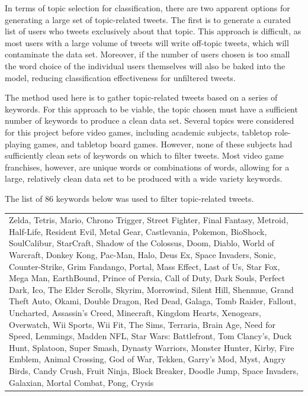 \documentclass[11pt]{revtex4-1}
\begin{document}
In terms of topic selection for classification, there are two apparent
options for generating a large set of topic-related tweets.  The first
is to generate a curated list of users who tweets exclusively about
that topic.  This approach is difficult, as most users with a large
volume of tweets will write off-topic tweets, which will contaminate
the data set.  Moreover, if the number of users chosen is too small
the word choice of the individual users themselves will also be baked
into the model, reducing classification effectiveness for unfiltered
tweets.

The method used here is to gather topic-related tweets based on a
series of keywords.  For this approach to be viable, the topic chosen
must have a sufficient number of keywords to produce a clean data set.
Several topics were considered for this project before video games,
including academic subjects, tabletop role-playing games, and tabletop
board games.  However, none of these subjects had sufficiently clean
sets of keywords on which to filter tweets.  Most video game
franchises, however, are unique words or combinations of words,
allowing for a large, relatively clean data set to be produced with a
wide variety keywords.

The list of 86 keywords below was used to filter topic-related tweets.

\begin{center}
\begin{tabular}{p{14cm}}
{\tiny Zelda, Tetris, Mario, Chrono Trigger, Street Fighter, Final
  Fantasy, Metroid, Half-Life, Resident Evil, Metal Gear, Castlevania,
  Pokemon, BioShock, SoulCalibur, StarCraft, Shadow of the Colossus,
  Doom, Diablo, World of Warcraft, Donkey Kong, Pac-Man, Halo, Deus
  Ex, Space Invaders, Sonic, Counter-Strike, Grim Fandango, Portal,
  Mass Effect, Last of Us, Star Fox, Mega Man, EarthBound, Prince of
  Persia, Call of Duty, Dark Souls, Perfect Dark, Ico, The Elder
  Scrolls, Skyrim, Morrowind, Silent Hill, Shenmue, Grand Theft Auto,
  Okami, Double Dragon, Red Dead, Galaga, Tomb Raider, Fallout,
  Uncharted, Assassin's Creed, Minecraft, Kingdom Hearts, Xenogears,
  Overwatch, Wii Sports, Wii Fit, The Sims, Terraria, Brain Age, Need
  for Speed, Lemmings, Madden NFL, Star Wars: Battlefront, Tom
  Clancy's, Duck Hunt, Splatoon, Super Smash, Dynasty Warriors,
  Monster Hunter, Kirby, Fire Emblem, Animal Crossing, God of War,
  Tekken, Garry's Mod, Myst, Angry Birds, Candy Crush, Fruit Ninja,
  Block Breaker, Doodle Jump, Space Invaders, Galaxian, Mortal Combat,
  Pong, Crysis}
\end{tabular}
\end{center}
\end{document}
